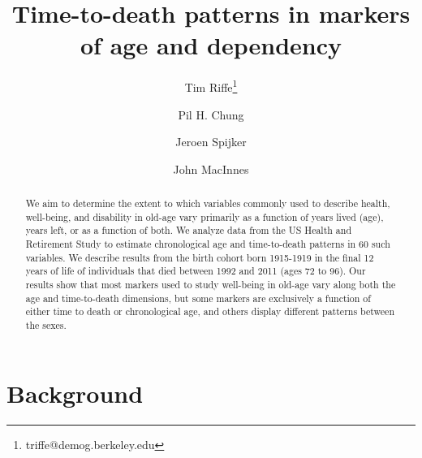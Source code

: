 \documentclass{article}
\begin{document}
\title{Time-to-death patterns in markers of age and dependency}

\author[1]{Tim Riffe\thanks{triffe@demog.berkeley.edu}}
\author[1]{Pil H. Chung}
\author[2,3]{Jeroen Spijker}
\author[4]{John MacInnes}

\maketitle

\begin{abstract}
We aim to determine the extent to which variables commonly
used to describe health, well-being, and disability in old-age vary primarily
as a function of years lived (age), years left, or as a function of both. We analyze data from the US Health and Retirement Study to estimate
chronological age and time-to-death patterns in 60 such variables. We describe
results from the birth cohort born 1915-1919 in the final 12 years of life of
individuals that died between 1992 and 2011 (ages 72 to 96). Our results show
that most markers used to study well-being in old-age vary along both the age
and time-to-death dimensions, but some markers are exclusively a function of
either time to death or chronological age, and others display different patterns
between the sexes.
\end{abstract}

\section*{Background}
\end{document}
